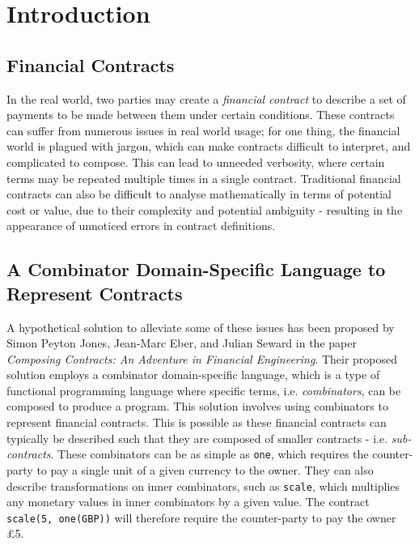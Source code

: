 \chapter{Introduction}

\section{Financial Contracts}

In the real world, two parties may create a \textit{financial contract} to describe a set of payments to be made between them under certain conditions. These contracts can suffer from numerous issues in real world usage; for one thing, the financial world is plagued with jargon, which can make contracts difficult to interpret, and complicated to compose. This can lead to unneeded verbosity, where certain terms may be repeated multiple times in a single contract. Traditional financial contracts can also be difficult to analyse mathematically in terms of potential cost or value, due to their complexity and potential ambiguity - resulting in the appearance of unnoticed errors in contract definitions.

\section{A Combinator Domain-Specific Language to Represent Contracts}

A hypothetical solution to alleviate some of these issues has been proposed by Simon Peyton Jones, Jean-Marc Eber, and Julian Seward in the paper \textit{Composing Contracts: An Adventure in Financial Engineering}\cite{SPJ}. Their proposed solution employs a combinator domain-specific language, which is a type of functional programming language where specific terms, i.e. \textit{combinators}, can be composed to produce a program. This solution involves using combinators to represent financial contracts. This is possible as these financial contracts can typically be described such that they are composed of smaller contracts - i.e. \textit{sub-contracts}. These combinators can be as simple as \texttt{one}, which requires the counter-party to pay a single unit of a given currency to the owner. They can also describe transformations on inner combinators, such as \texttt{scale}, which multiplies any monetary values in inner combinators by a given value. The contract \texttt{scale(5, one(GBP))} will therefore require the counter-party to pay the owner \pounds 5. \\


